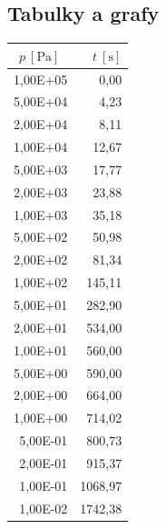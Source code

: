 \documentclass[english]{article}
\newcommand{\unitb}[1]{~\mathrm{[#1]}}
\begin{document}
\clearpage
\subsection{Tabulky a grafy}

\begin{table}[h!]
\begin{minipage} [c]{.45\linewidth}
\centering
\vspace{1.05cm}
\begin{tabular}{|r|r|}
\hline
  \boldmath{}\textbf{$p\unitb{Pa}$}\unboldmath{}\ & \boldmath{}\textbf{$t\unitb{s}$}\unboldmath{} \\
       \hline
       1,00E+05 & 0,00 \\\hline
       5,00E+04 & 4,23 \\\hline
       2,00E+04 & 8,11 \\\hline
       1,00E+04 & 12,67 \\\hline
       5,00E+03 & 17,77 \\\hline
       2,00E+03 & 23,88 \\\hline
       1,00E+03 & 35,18 \\\hline
       5,00E+02 & 50,98 \\\hline
       2,00E+02 & 81,34 \\\hline
       1,00E+02 & 145,11 \\\hline
       5,00E+01 & 282,90 \\\hline
       2,00E+01 & 534,00 \\\hline
       1,00E+01 & 560,00 \\\hline
       5,00E+00 & 590,00 \\\hline
       2,00E+00 & 664,00 \\\hline
       1,00E+00 & 714,02 \\\hline
       5,00E-01 & 800,73 \\\hline
       2,00E-01 & 915,37 \\\hline
       1,00E-01 & 1068,97 \\\hline
       1,00E-02 & 1742,38 \\\hline
      

\end{tabular}
\end{minipage}
\end{table}
\end{document}
